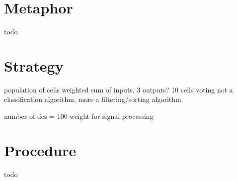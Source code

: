 \documentclass[a4paper, 11pt]{article}
\begin{document}
\section{Metaphor}
\label{sec:metaphor}
todo

\section{Strategy}
\label{sec:strategy}

population of cells
weighted sum of inputs, 3 outputs?
10 cells
voting
not a classification algorithm, more a filtering/sorting algorithm


number of dcs = 100
weight for signal processing


\section{Procedure}
\label{sec:procedure}
todo

\end{document}
